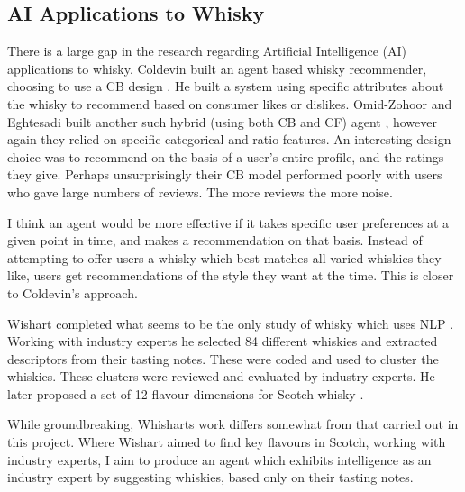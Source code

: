 \subsection{AI Applications to Whisky}\label{ssec:ml2whisk}

There is a large gap in the research regarding Artificial Intelligence (AI) applications to whisky.
Coldevin built an agent based whisky recommender, choosing to use a CB design \cite{Coldevin2005}.  He 
built a system using specific attributes about the whisky to recommend based
on consumer likes or dislikes. Omid-Zohoor and Eghtesadi built another such hybrid (using both CB and CF) 
agent \cite{Omidzohoor}, however again they relied on specific categorical and ratio features.
An interesting design choice was to recommend on the basis of a user's entire profile, and the 
ratings they give.  Perhaps unsurprisingly their CB model performed poorly with users who gave large 
numbers of reviews. The more reviews the more noise.

I think an agent would be more effective if it takes specific user preferences
at a given point in time, and makes a recommendation on that basis.  Instead of attempting
to offer users a whisky which best matches all varied whiskies they like, users get
recommendations of the style they want at the time.  This is 
closer to Coldevin's approach.

Wishart completed what seems to be the only study of whisky which uses NLP \cite{Wishart2000}.
Working with industry experts he selected 84 different whiskies and extracted descriptors from their tasting notes. 
These were coded and used to cluster the whiskies. These clusters were reviewed and evaluated by 
industry experts.  He later proposed a set of 12 flavour dimensions for Scotch whisky \cite{Wishart2009}.

While groundbreaking, Whisharts work differs somewhat from that carried out in this project.  Where Wishart aimed to find
key flavours in Scotch, working with industry experts, I aim to produce an agent which exhibits intelligence as an 
industry expert by suggesting whiskies, based only on their tasting notes.

